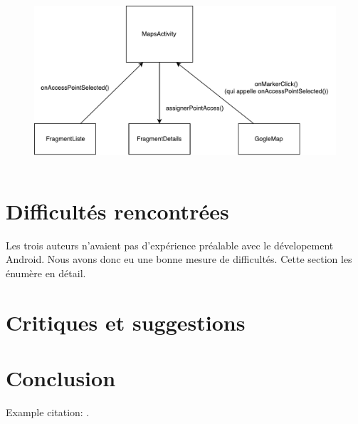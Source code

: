 \documentclass[12pt]{article}
\newcommand\code[1]{\texttt{#1}}
\begin{document}
	\begin{figure}[h]
		\label{fig_interaction}
		\centering
		\includegraphics[height=2.5in]{communication_diag.pdf}
	\end{figure}





\section{Difficultés rencontrées}

	Les trois auteurs n'avaient pas d'expérience préalable avec le dévelopement
	Android.  Nous avons donc eu une bonne mesure de difficultés.  Cette section
	les énumère en détail.



\section{Critiques et suggestions}
\section{Conclusion}
Example citation: .



\end{document}
